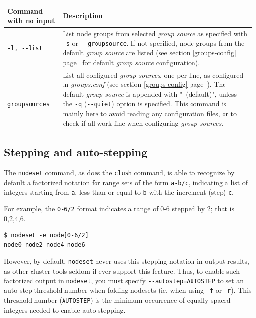 \documentclass[english,a4paper]{csuserguide}
\newcommand{\nodeset}{\texttt{nodeset}\xspace}
\newcommand{\clush}{\texttt{clush}\xspace}
\begin{document}
\begin{center}
\label{nodeset-cmds2}
\begin{tabular}{|p{3.2cm}|p{13.2cm}|} 
\hline 
\textbf{Command with no input} & \textbf{Description} \\
\hline
\verb+-l, --list+ & List node groups from selected \textit{group source} as specified with \verb+-s+ or \verb+--groupsource+. If not specified, node groups from the default \textit{group source} are listed (see section \ref{groups-config} page~\pageref{groups-config} for default \textit{group source} configuration).\\
\hline
\verb+--groupsources+ & List all configured \textit{group sources}, one per line, as configured in \textit{groups.conf} (see section \ref{groups-config} page~\pageref{groups-config}). The default \textit{group source} is appended with \mbox{" (default)"}, unless the \verb+-q+ (\verb+--quiet+) option is specified. This command is  mainly here to avoid reading any configuration files, or to check if all work fine when configuring \textit{group sources}.\\
\hline
\end{tabular}
\end{center}

\subsection{Stepping and auto-stepping}
\label{nodeset-stepping}

The \nodeset command, as does the \clush command, is able to recognize by default a factorized notation for range sets of the form \verb+a-b/c+, indicating a list of integers starting from \verb+a+, less than or equal to \verb+b+ with the increment (step) \verb+c+.

For example, the \verb+0-6/2+ format indicates a range of 0-6 stepped by 2; that is 0,2,4,6.
\medskip
\begin{lstlisting}[breaklines=true, breakatwhitespace=true] 
$ nodeset -e node[0-6/2]
node0 node2 node4 node6
\end{lstlisting}

However, by default, \nodeset never uses this stepping notation in output results, as other cluster tools seldom if ever support this feature. Thus, to enable such factorized output in \nodeset, you must specify \verb+--autostep=AUTOSTEP+ to set an auto step threshold number when folding nodesets (ie. when using \verb+-f+ or \verb+-r+). This threshold number (\verb+AUTOSTEP+) is the minimum occurrence of equally-spaced integers needed to enable auto-stepping.
\end{document}
